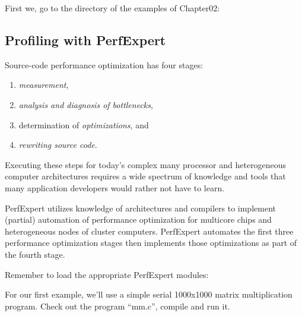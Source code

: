 First we, go to the directory of the examples of Chapter02:

\begin{prompt}
\end{prompt}

\subsection{Profiling with PerfExpert}
\label{subsec:Profiling_with_PerfExpert}

Source-code performance optimization has four stages:

\begin{enumerate}
  \item  \emph{measurement},
  \item  \emph{analysis and diagnosis of bottlenecks},
  \item  determination of \emph{optimizations}, and
  \item  \emph{rewriting source code}.
\end{enumerate}

Executing these steps for today's complex many processor and heterogeneous computer architectures requires a wide spectrum of knowledge and tools that many application developers would rather not have to learn.

PerfExpert utilizes knowledge of architectures and compilers to implement (partial) automation of performance optimization for multicore chips and heterogeneous nodes of cluster computers. PerfExpert automates the first three performance optimization stages then implements those optimizations as part of the fourth stage.

Remember to load the appropriate PerfExpert modules:

\iftacc
\begin{prompt}
\end{prompt}
\fi
\ifvsc
\begin{prompt}
\end{prompt}
\fi

For our first example, we'll use a simple serial 1000x1000 matrix multiplication program. Check out the program ``mm.c'', compile and run it.

\begin{prompt}
\end{prompt}


